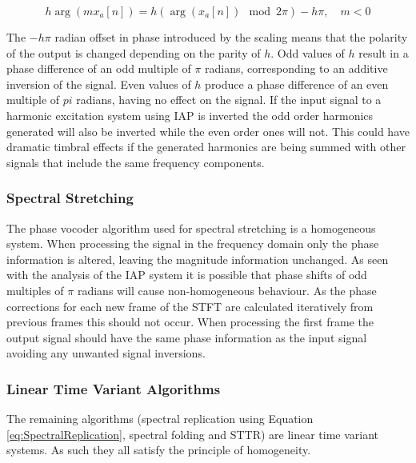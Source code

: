 			\begin{equation}
				h\arg(mx_{a}[n]) = h(\arg(x_{a}[n]) \mod 2\pi) - h\pi, \quad m < 0
				\label{eq:IAPOrderHomogeneity}
			\end{equation}

			The $-h\pi$ radian offset in phase introduced by the scaling means that the polarity of the output
			is changed depending on the parity of $h$. Odd values of $h$ result in a phase difference of an odd
			multiple of $\pi$ radians, corresponding to an additive inversion of the signal. Even values of $h$
			produce a phase difference of an even multiple of $pi$ radians, having no effect on the signal. If
			the input signal to a harmonic excitation system using IAP is inverted the odd order harmonics
			generated will also be inverted while the even order ones will not. This could have dramatic
			timbral effects if the generated harmonics are being summed with other signals that include the
			same frequency components.

		\subsubsection*{Spectral Stretching}
			The phase vocoder algorithm used for spectral stretching is a homogeneous system. When processing
			the signal in the frequency domain only the phase information is altered, leaving the magnitude
			information unchanged. As seen with the analysis of the IAP system it is possible that phase shifts
			of odd multiples of $\pi$ radians will cause non-homogeneous behaviour. As the phase corrections
			for each new frame of the STFT are calculated iteratively from previous frames this should not
			occur. When processing the first frame the output signal should have the same phase information as
			the input signal avoiding any unwanted signal inversions.

		\subsubsection*{Linear Time Variant Algorithms}
			The remaining algorithms (spectral replication using Equation \ref{eq:SpectralReplication},
			spectral folding and STTR) are linear time variant systems. As such they all satisfy the principle
			of homogeneity.

